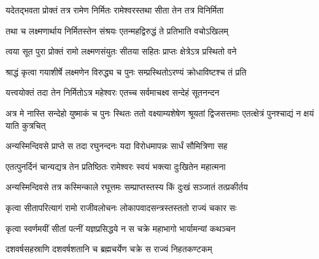 
\vakta{}
\shrota{}
\tags{}
\notes{}

\storymeta





\twolineshloka
{यदेतद्भवता प्रोक्तं तत्र रामेण निर्मितः}
{रामेश्वरस्तथा सीता तेन तत्र विनिर्मिता}%

\twolineshloka
{तथा च लक्ष्मणार्थाय निर्मितस्तेन संश्रयः}
{एतन्महद्विरुद्धं ते प्रतिभाति वचोऽखिलम्}%

\twolineshloka
{त्वया सूत पुरा प्रोक्तं रामो लक्ष्मणसंयुतः}
{सीतया सहितः प्राप्तः क्षेत्रेऽत्र प्रस्थितो वने}%

\twolineshloka
{श्राद्धं कृत्वा गयाशीर्षे लक्ष्मणेन विरुद्ध्य च}
{पुनः सम्प्रस्थितोऽरण्यं क्रोधाविष्टश्च तं प्रति}%

\twolineshloka
{यत्त्वयोक्तं तदा तेन निर्मितोऽत्र महेश्वरः}
{एतच्च सर्वमाचक्ष्व सन्देहं सूतनन्दन}%



\threelineshloka
{अत्र मे नास्ति सन्देहो युष्माकं च पुनः स्थितः}
{ततो वक्ष्याम्यशेषेण श्रूयतां द्विजसत्तमाः}
{एतत्क्षेत्रं पुनश्चाद्यं न क्षयं याति कुत्रचित्}%

\twolineshloka
{अन्यस्मिन्दिवसे प्राप्ते स तदा रघुनन्दनः}
{यदा विरोधमापन्नः सार्धं सौमित्रिणा सह}%

\twolineshloka
{एतत्पुनर्दिनं चान्यद्यत्र तेन प्रतिष्ठितः}
{रामेश्वरः स्वयं भक्त्या दुःखितेन महात्मना}%


\twolineshloka
{अन्यस्मिन्दिवसे तत्र कस्मिन्काले रघूत्तमः}
{सम्प्राप्तस्तस्य किं दुःखं सञ्जातं तत्प्रकीर्तय}%


\twolineshloka
{कृत्वा सीतापरित्यागं रामो राजीवलोचनः}
{लोकापवादसन्त्रस्तस्ततो राज्यं चकार सः}%

\twolineshloka
{कृत्वा स्वर्णमयीं सीतां पत्नीं यज्ञप्रसिद्धये}
{न स चक्रे महाभागो भार्यामन्यां कथञ्चन}%

\twolineshloka
{दशवर्षसहस्राणि दशवर्षशतानि च}
{ब्रह्मचर्येण चक्रे स राज्यं निहतकण्टकम्}%

